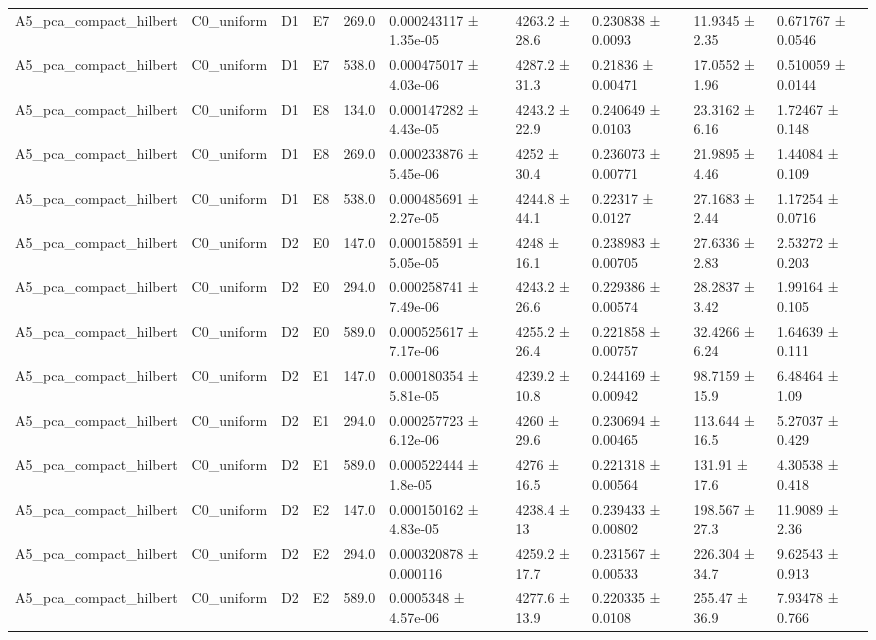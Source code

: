 \begin{table}
\begin{tabular}{llllllllll}
A5\_pca\_compact\_hilbert & C0\_uniform & D1 & E7 & 269.0 & 0.000243117 ± 1.35e-05 & 4263.2 ± 28.6 & 0.230838 ± 0.0093 & 11.9345 ± 2.35 & 0.671767 ± 0.0546 \\
A5\_pca\_compact\_hilbert & C0\_uniform & D1 & E7 & 538.0 & 0.000475017 ± 4.03e-06 & 4287.2 ± 31.3 & 0.21836 ± 0.00471 & 17.0552 ± 1.96 & 0.510059 ± 0.0144 \\
A5\_pca\_compact\_hilbert & C0\_uniform & D1 & E8 & 134.0 & 0.000147282 ± 4.43e-05 & 4243.2 ± 22.9 & 0.240649 ± 0.0103 & 23.3162 ± 6.16 & 1.72467 ± 0.148 \\
A5\_pca\_compact\_hilbert & C0\_uniform & D1 & E8 & 269.0 & 0.000233876 ± 5.45e-06 & 4252 ± 30.4 & 0.236073 ± 0.00771 & 21.9895 ± 4.46 & 1.44084 ± 0.109 \\
A5\_pca\_compact\_hilbert & C0\_uniform & D1 & E8 & 538.0 & 0.000485691 ± 2.27e-05 & 4244.8 ± 44.1 & 0.22317 ± 0.0127 & 27.1683 ± 2.44 & 1.17254 ± 0.0716 \\
A5\_pca\_compact\_hilbert & C0\_uniform & D2 & E0 & 147.0 & 0.000158591 ± 5.05e-05 & 4248 ± 16.1 & 0.238983 ± 0.00705 & 27.6336 ± 2.83 & 2.53272 ± 0.203 \\
A5\_pca\_compact\_hilbert & C0\_uniform & D2 & E0 & 294.0 & 0.000258741 ± 7.49e-06 & 4243.2 ± 26.6 & 0.229386 ± 0.00574 & 28.2837 ± 3.42 & 1.99164 ± 0.105 \\
A5\_pca\_compact\_hilbert & C0\_uniform & D2 & E0 & 589.0 & 0.000525617 ± 7.17e-06 & 4255.2 ± 26.4 & 0.221858 ± 0.00757 & 32.4266 ± 6.24 & 1.64639 ± 0.111 \\
A5\_pca\_compact\_hilbert & C0\_uniform & D2 & E1 & 147.0 & 0.000180354 ± 5.81e-05 & 4239.2 ± 10.8 & 0.244169 ± 0.00942 & 98.7159 ± 15.9 & 6.48464 ± 1.09 \\
A5\_pca\_compact\_hilbert & C0\_uniform & D2 & E1 & 294.0 & 0.000257723 ± 6.12e-06 & 4260 ± 29.6 & 0.230694 ± 0.00465 & 113.644 ± 16.5 & 5.27037 ± 0.429 \\
A5\_pca\_compact\_hilbert & C0\_uniform & D2 & E1 & 589.0 & 0.000522444 ± 1.8e-05 & 4276 ± 16.5 & 0.221318 ± 0.00564 & 131.91 ± 17.6 & 4.30538 ± 0.418 \\
A5\_pca\_compact\_hilbert & C0\_uniform & D2 & E2 & 147.0 & 0.000150162 ± 4.83e-05 & 4238.4 ± 13 & 0.239433 ± 0.00802 & 198.567 ± 27.3 & 11.9089 ± 2.36 \\
A5\_pca\_compact\_hilbert & C0\_uniform & D2 & E2 & 294.0 & 0.000320878 ± 0.000116 & 4259.2 ± 17.7 & 0.231567 ± 0.00533 & 226.304 ± 34.7 & 9.62543 ± 0.913 \\
A5\_pca\_compact\_hilbert & C0\_uniform & D2 & E2 & 589.0 & 0.0005348 ± 4.57e-06 & 4277.6 ± 13.9 & 0.220335 ± 0.0108 & 255.47 ± 36.9 & 7.93478 ± 0.766 \\

\end{tabular}
\end{table}
